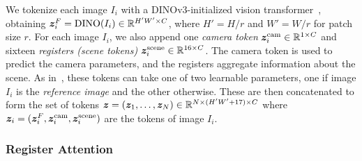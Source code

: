 We tokenize each image $I_i$ with a DINOv3-initialized vision transformer~\cite{simeoni25dinov3}, obtaining
$
\boldsymbol{z}_i^F = \operatorname{DINO}(I_i) \in \mathbb{R}^{H'W'\times C}
$,
where $H'=H/r$ and $W'=W/r$ for patch size $r$.
For each image $I_i$, we also append one \emph{camera token} $\boldsymbol{z}^{\text{cam}}_i\in\mathbb{R}^{1\times C}$ and sixteen \emph{registers (scene tokens)} $\boldsymbol{z}^{\text{scene}}_i\in\mathbb{R}^{16\times C}$.
The camera token is used to predict the camera parameters, and the registers aggregate information about the scene.
As in~\cite{wang25vggt}, these tokens can take one of two learnable parameters, one if image $I_i$ is the \emph{reference image} and the other otherwise.
These are then concatenated to form the set of tokens
$
\boldsymbol{z} = (\boldsymbol{z}_1,\dots,\boldsymbol{z}_N) \in \mathbb{R}^{N \times (H'W'+17)\times C}
$
where $\boldsymbol{z}_i = (\boldsymbol{z}_i^F, \boldsymbol{z}^{\text{cam}}_i, \boldsymbol{z}^{\text{scene}}_i)$ are the tokens of image $I_i$.

\subsubsection{Register Attention}%
\label{sec:global-attention}




